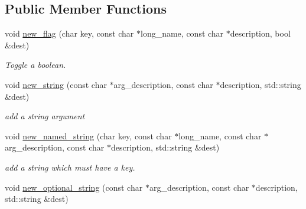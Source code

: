 \subsection*{Public Member Functions}
\begin{DoxyCompactItemize}
\item 
\hypertarget{classdsr_1_1_argument__helper_a5be685841d870bfe4896c9a2b32ff5a4}{
void \hyperlink{classdsr_1_1_argument__helper_a5be685841d870bfe4896c9a2b32ff5a4}{new\_\-flag} (char key, const char $\ast$long\_\-name, const char $\ast$description, bool \&dest)}
\label{classdsr_1_1_argument__helper_a5be685841d870bfe4896c9a2b32ff5a4}

\begin{DoxyCompactList}\small\item\em Toggle a boolean. \end{DoxyCompactList}\item 
\hypertarget{classdsr_1_1_argument__helper_ad439b84cdfa131d8b160f48e23e4a429}{
void \hyperlink{classdsr_1_1_argument__helper_ad439b84cdfa131d8b160f48e23e4a429}{new\_\-string} (const char $\ast$arg\_\-description, const char $\ast$description, std::string \&dest)}
\label{classdsr_1_1_argument__helper_ad439b84cdfa131d8b160f48e23e4a429}

\begin{DoxyCompactList}\small\item\em add a string argument \end{DoxyCompactList}\item 
\hypertarget{classdsr_1_1_argument__helper_a0b63381052761013d7226a0b7cd345b0}{
void \hyperlink{classdsr_1_1_argument__helper_a0b63381052761013d7226a0b7cd345b0}{new\_\-named\_\-string} (char key, const char $\ast$long\_\-name, const char $\ast$arg\_\-description, const char $\ast$description, std::string \&dest)}
\label{classdsr_1_1_argument__helper_a0b63381052761013d7226a0b7cd345b0}

\begin{DoxyCompactList}\small\item\em add a string which must have a key. \end{DoxyCompactList}\item 
\hypertarget{classdsr_1_1_argument__helper_a3d88825e195dfdac305e3c07befe32ec}{
void \hyperlink{classdsr_1_1_argument__helper_a3d88825e195dfdac305e3c07befe32ec}{new\_\-optional\_\-string} (const char $\ast$arg\_\-description, const char $\ast$description, std::string \&dest)}
\label{classdsr_1_1_argument__helper_a3d88825e195dfdac305e3c07befe32ec}


\end{DoxyCompactItemize}
